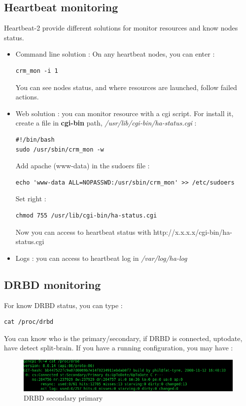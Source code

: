 \documentclass[a4paper,10pt]{report}
\begin{document}
\subsection{Heartbeat monitoring}
\label{hb-monitor}
Heartbeat-2 provide different solutions for monitor resources and know nodes status.
\begin{itemize}
 \item Command line solution : On any heartbeat nodes, you can enter :
\begin{lstlisting}
crm_mon -i 1
\end{lstlisting}
You can see nodes status, and where resources are launched, follow failed actions.
\item Web solution : you can monitor resource with a cgi script. For install it, create a file in \textbf{cgi-bin} path, \textit{/usr/lib/cgi-bin/ha-status.cgi} :
\begin{lstlisting}
#!/bin/bash
sudo /usr/sbin/crm_mon -w
\end{lstlisting}
Add apache (www-data) in the sudoers file :
\begin{lstlisting}
echo 'www-data ALL=NOPASSWD:/usr/sbin/crm_mon' >> /etc/sudoers
\end{lstlisting}
Set right :
\begin{lstlisting}
chmod 755 /usr/lib/cgi-bin/ha-status.cgi
\end{lstlisting}
Now you can access to heartbeat status with http://x.x.x.x/cgi-bin/ha-status.cgi
\item Logs : you can access to heartbeat log in \textit{/var/log/ha-log}

\end{itemize}


\subsection{DRBD monitoring}
For know DRBD status, you can type :
\begin{lstlisting}
cat /proc/drbd
\end{lstlisting}
You can know who is the primary/secondary, if DRBD is connected, uptodate, have detect split-brain. If you have a running configuration, you may have :
\begin{figure}[!h]
\begin{center}
\includegraphics[scale=0.5]{schema/drbd-s-p.png}
\end{center}
\caption{DRBD secondary primary} 
\label{hb-gui-2nodes} 
\end{figure}
\end{document}
